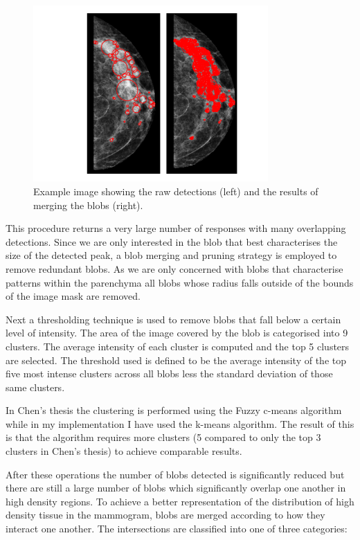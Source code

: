 \begin{figure}[H]
	\label{fig:blob-detection}
	\centering
	\includegraphics[width=0.8\textwidth]{Images/blob-detections.png}	
	\caption{Example image showing the raw detections (left) and the results of merging the blobs (right).}
\end{figure}

This procedure returns a very large number of responses with many overlapping detections. Since we are only interested in the blob that best characterises the size of the detected peak, a blob merging and pruning strategy is employed to remove redundant blobs. As we are only concerned with blobs that characterise patterns within the parenchyma all blobs whose radius falls outside of the bounds of the image mask are removed. 

Next a thresholding technique is used to remove blobs that fall below a certain level of intensity. The area of the image covered by the blob is categorised into 9 clusters. The average intensity of each cluster is computed and the top 5 clusters are selected. The threshold used is defined to be the average intensity of the top five most intense clusters across all blobs less the standard deviation of those same clusters. 

In Chen's thesis the clustering is performed using the Fuzzy c-means algorithm while in my implementation I have used the k-means algorithm. The result of this is that the algorithm requires more clusters (5 compared to only the top 3 clusters in Chen's thesis) to achieve comparable results.

After these operations the number of blobs detected is significantly reduced but there are still a large number of blobs which significantly overlap one another in high density regions. To achieve a better representation of the distribution of high density tissue in the mammogram, blobs are merged according to how they interact one another. The intersections are classified into one of three categories:

